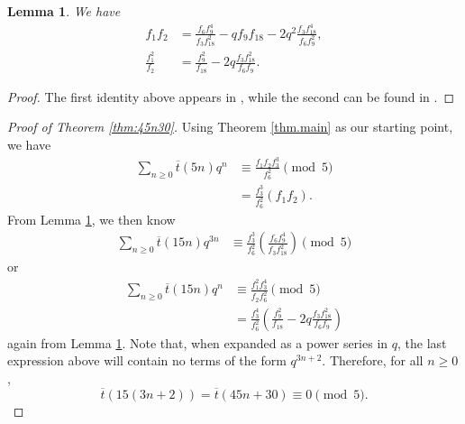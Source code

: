 \documentclass{amsart}
\newtheorem{lemma}[theorem]{Lemma}
\theoremstyle{definition}
\newcommand{\tbar}{\overline{t}}
\begin{document}
\begin{lemma}
\label{lemma:3-dissections}
We have 
\begin{align*}
f_1f_2 &= \frac{f_6f_9^4}{f_3f_{18}^2} - qf_9f_{18} -2q^2\frac{f_3f_{18}^4}{f_6f_9^2}, \\
\frac{f_1^2}{f_2} &= \frac{f_9^2}{f_{18}} - 2q\frac{f_3f_{18}^2}{f_6f_9}.
\end{align*}
\end{lemma}
\begin{proof}
The first identity above appears in \cite{Chan}, while the second can be found in \cite[(14.3.2)]{Hirschhorn}.
\end{proof}
\begin{proof}[Proof of Theorem \ref{thm:45n30}]
Using Theorem \ref{thm.main} as our starting point, we have
\begin{align*}
\sum_{n\geq0}\tbar(5n)q^{n}
&\equiv
\frac{f_1f_2f_3^{3}}{f_6^{2}}\pmod5 \\
&= 
\frac{f_3^{3}}{f_6^{2}}(f_1f_2).
\end{align*} 
From Lemma \ref{lemma:3-dissections}, we then know 
\begin{align*}
\sum_{n\geq0}\tbar(15n)q^{3n}
&\equiv
\frac{f_3^{3}}{f_6^{2}}\left( \frac{f_6f_9^4}{f_3f_{18}^2} \right)  \pmod{5}
\end{align*} 
or 
\begin{align*}
\sum_{n\geq0}\tbar(15n)q^{n}
&\equiv
\frac{f_1^{2}f_3^4}{f_2f_6^{2}} \pmod{5} \\
&=  
\frac{f_3^4}{f_6^{2}}\left(  \frac{f_9^2}{f_{18}} - 2q\frac{f_3f_{18}^2}{f_6f_9} \right)
\end{align*} 
again from Lemma \ref{lemma:3-dissections}.  Note that, when expanded as a power series in $q$, the last expression above will contain no terms of the form $q^{3n+2}$.  Therefore, for all $n\geq 0$, 
$$
\tbar(15(3n+2)) = \tbar(45n+30) \equiv 0 \pmod{5}.
$$
\end{proof}





\end{document}
